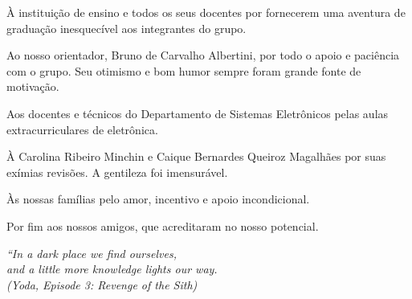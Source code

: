 \documentclass[
	12pt,				%
	openright,			%
	oneside,			%
	a4paper,			%
	hyphens,			%
	english,			%
	brazil				%
]{abntex2}
\begin{document}

	\frenchspacing


	\imprimircapa

	\imprimirfolhaderosto*

	



	\begin{agradecimentos}
		À instituição de ensino e todos os seus docentes por fornecerem uma aventura de graduação inesquecível aos integrantes do grupo.

		Ao nosso orientador, Bruno de Carvalho Albertini, por todo o apoio e paciência com o grupo. Seu otimismo e bom humor sempre foram grande fonte de motivação.

		Aos docentes e técnicos do Departamento de Sistemas Eletrônicos pelas aulas extracurriculares de eletrônica.

		À Carolina Ribeiro Minchin e Caique Bernardes Queiroz Magalhães por suas exímias revisões. A gentileza foi imensurável.

		Às nossas famílias pelo amor, incentivo e apoio incondicional.

		Por fim aos nossos amigos, que acreditaram no nosso potencial.
	\end{agradecimentos}

	\begin{epigrafe}
		\vspace*{\fill}
		\begin{flushright}
			\textit{``In a dark place we find ourselves,\\
				and a little more knowledge	lights our way.\\
				(Yoda, Episode 3: Revenge of the Sith)}
		\end{flushright}
	\end{epigrafe}
\end{document}

